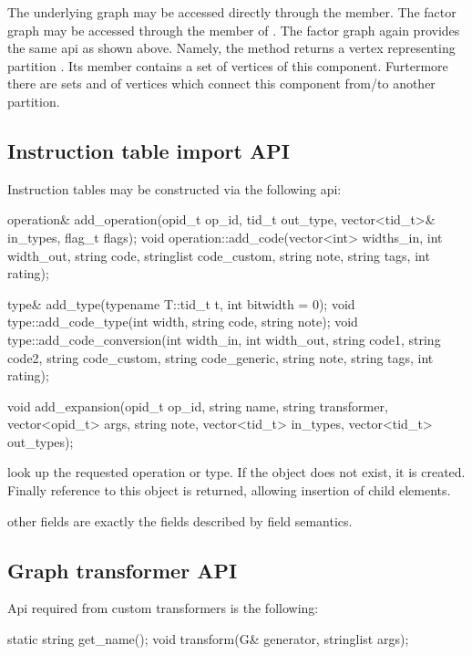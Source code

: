 The underlying graph may be accessed directly through the  member. The factor graph may be accessed through the  member of . The factor graph again provides the same api as shown above. Namely, the  method returns a vertex representing partition . Its  member contains a set  of vertices of this component. Furtermore there are sets  and  of vertices which connect this component from/to another partition.  

\subsection{Instruction table import API}

Instruction tables may be constructed via the following api:

\begin{code}
operation& add_operation(opid_t op_id, tid_t out_type, 
  vector<tid_t>& in_types, flag_t flags);
void operation::add_code(vector<int> widths_in, int width_out, string code, 
  stringlist code_custom, string note, string tags, int rating);

type& add_type(typename T::tid_t t, int bitwidth = 0);
void type::add_code_type(int width, string code, string note);
void type::add_code_conversion(int width_in, int width_out, 
  string code1, string code2, string code_custom, 
  string code_generic, string note, string tags, int rating);

void add_expansion(opid_t op_id, string name, string transformer, 
  vector<opid_t> args, string note, vector<tid_t> in_types, 
  vector<tid_t> out_types);
\end{code}

\begin{description}
  \item {} look up the requested operation or type. If the object does not exist, it is created. Finally reference to this object is returned, allowing insertion of child elements.
  \item other fields are exactly the fields described by field semantics.
\end{description}

\subsection{Graph transformer API}

Api required from custom transformers is the following:
\begin{code}
 static string get_name();
 void transform(G& generator, stringlist args);
\end{code}

